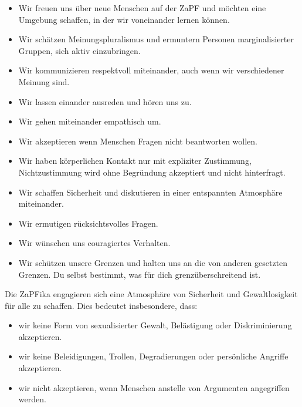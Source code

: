 \documentclass[12pt,oneside]{scrartcl}
\begin{document}
\begin{itemize}
\item Wir freuen uns über neue Menschen auf der ZaPF und möchten eine Umgebung
schaffen, in der wir voneinander lernen können.

\item Wir schätzen Meinungspluralismus und ermuntern Personen marginalisierter
Gruppen, sich aktiv einzubringen.

\item Wir kommunizieren respektvoll miteinander, auch wenn wir verschiedener Meinung
sind.

\item Wir lassen einander ausreden und hören uns zu.

\item Wir gehen miteinander empathisch um.

\item Wir akzeptieren wenn Menschen Fragen nicht beantworten wollen.

\item Wir haben körperlichen Kontakt nur mit expliziter Zustimmung, Nichtzustimmung
wird ohne Begründung akzeptiert und nicht hinterfragt.

\item Wir schaffen Sicherheit und diskutieren in einer entspannten Atmosphäre
miteinander.

\item Wir ermutigen rücksichtsvolles Fragen.

\item Wir wünschen uns couragiertes Verhalten.

\item Wir schützen unsere Grenzen und halten uns an die von anderen gesetzten
Grenzen. Du selbst bestimmt, was für dich grenzüberschreitend ist.
\end{itemize}

Die ZaPFika engagieren sich eine Atmosphäre von Sicherheit und Gewaltlosigkeit
für alle zu schaffen. Dies bedeutet insbesondere, dass:

\begin{itemize}
\item wir keine Form von sexualisierter Gewalt, Belästigung oder Diskriminierung
akzeptieren.

\item wir keine Beleidigungen, Trollen, Degradierungen oder persönliche Angriffe
akzeptieren.

\item wir nicht akzeptieren, wenn Menschen anstelle von Argumenten angegriffen
werden.
\end{itemize}
\end{document}
